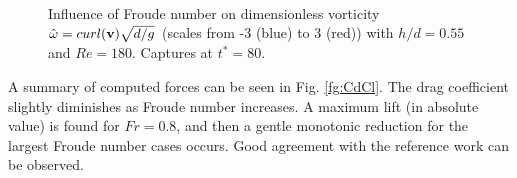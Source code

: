 \begin{figure}[htbp]
\begin{center}
{    } \\ 
 \\ 
 \\ 
  \end{center}
  \caption{\label{fg:vort_Re180} Influence of Froude number on dimensionless vorticity $\hat\omega = curl(\mathbf{v}) \sqrt{d/g}$ (scales from -3 (blue) to 3 (red)) with $h/d = 0.55$ and $Re=180$. Captures at $t^*=80$.
}
\end{figure}


A summary of computed forces can be seen in Fig. \ref{fg:CdCl}. The drag coefficient slightly diminishes as Froude number increases. A maximum lift (in absolute value) is found for $Fr = 0.8$, and then a gentle monotonic reduction for the largest Froude number cases occurs. Good agreement with the reference work can be observed.

